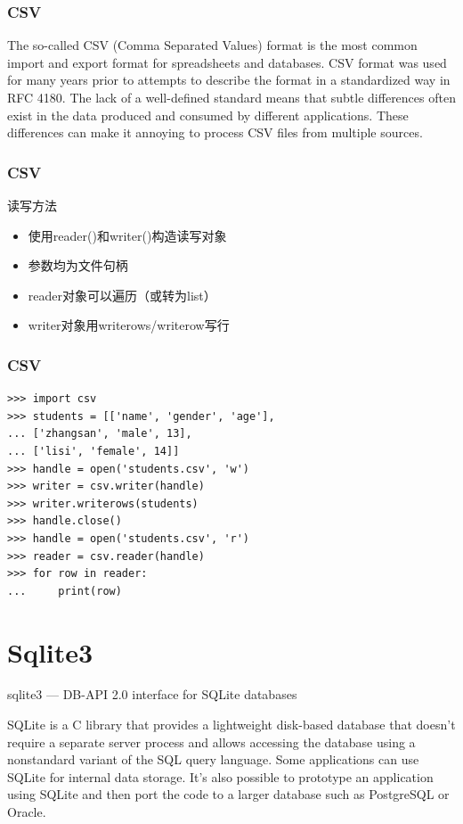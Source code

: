 \documentclass{beamer}
\begin{document}
\begin{frame}
  \frametitle{CSV}
The so-called CSV (Comma Separated Values) format is the most common import and
export format for spreadsheets and databases.  CSV format was used for many
years prior to attempts to describe the format in a standardized way in
RFC 4180.  The lack of a well-defined standard means that subtle differences
often exist in the data produced and consumed by different applications.  These
differences can make it annoying to process CSV files from multiple sources.
	
\end{frame}
\begin{frame}
  \frametitle{CSV}
	\begin{block}
		{读写方法}
		\begin{itemize}
			\item 使用reader()和writer()构造读写对象
			\item 参数均为文件句柄
			\item reader对象可以遍历（或转为list）
			\item writer对象用writerows/writerow写行
		\end{itemize}
	\end{block}
\end{frame}

\begin{frame}[t,fragile]
  \frametitle{CSV}
\begin{verbatim}
>>> import csv
>>> students = [['name', 'gender', 'age'],
... ['zhangsan', 'male', 13],
... ['lisi', 'female', 14]]
>>> handle = open('students.csv', 'w')
>>> writer = csv.writer(handle)
>>> writer.writerows(students)
>>> handle.close()
>>> handle = open('students.csv', 'r')
>>> reader = csv.reader(handle)
>>> for row in reader:
...     print(row)
\end{verbatim}
	
\end{frame}

\section{Sqlite3} %
\label{sec:Sqlite3}

\begin{frame}[t]{sqlite3 --- DB-API 2.0 interface for SQLite databases}

SQLite is a C library that provides a lightweight disk-based database that
doesn't require a separate server process and allows accessing the database
using a nonstandard variant of the SQL query language. Some applications can use
SQLite for internal data storage.  It's also possible to prototype an
application using SQLite and then port the code to a larger database such as
PostgreSQL or Oracle.

\end{frame}
\end{document}
